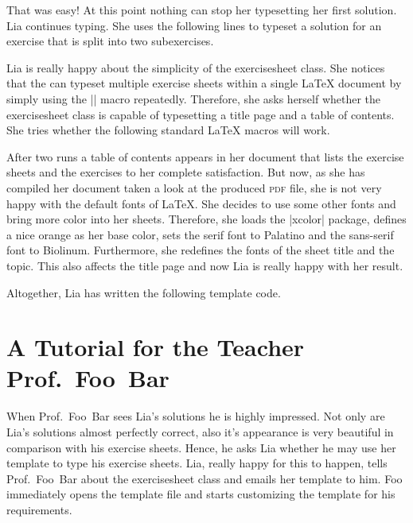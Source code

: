 \documentclass[a4paper,fleqn,9pt]{report}
\def\exercisesheet{{exercisesheet}}
\begin{document}
That was easy! At this point nothing can stop her typesetting her
first solution. Lia continues typing. She uses the following lines to
typeset a solution for an exercise that is split into two
subexercises.



Lia is really happy about the simplicity of the \exercisesheet{}
class. She notices that the can typeset multiple exercise sheets
within a single \LaTeX{} document by simply using the
|\sheet| macro repeatedly. Therefore, she asks herself
whether the \exercisesheet{} class is capable of typesetting a
title page and a table of contents. She tries whether the following
standard \LaTeX{} macros will work.



After two runs a table of contents appears in her document that lists
the exercise sheets and the exercises to her complete satisfaction.
But now, as she has compiled her document taken a look at the produced
\textsc{pdf} file, she is not very happy with the default fonts of
\LaTeX{}. She decides to use some other fonts and bring more color
into her sheets. Therefore, she loads the |xcolor| package,
defines a nice orange as her base color, sets the serif font to
Palatino and the sans-serif font to Biolinum. Furthermore, she
redefines the fonts of the sheet title and the topic. This also
affects the title page and now Lia is really happy with her result.


Altogether, Lia has written the following template code.




\section{A Tutorial for the Teacher Prof.~Foo~Bar}

When Prof.~Foo~Bar sees Lia's solutions he is highly impressed. Not
only are Lia's solutions almost perfectly correct, also it's
appearance is very beautiful in comparison with his exercise sheets.
Hence, he asks Lia whether he may use her template to type his
exercise sheets. Lia, really happy for this to happen, tells
Prof.~Foo~Bar about the \exercisesheet{} class and emails her template
to him. Foo immediately opens the template file and starts customizing
the template for his requirements.
\end{document}

